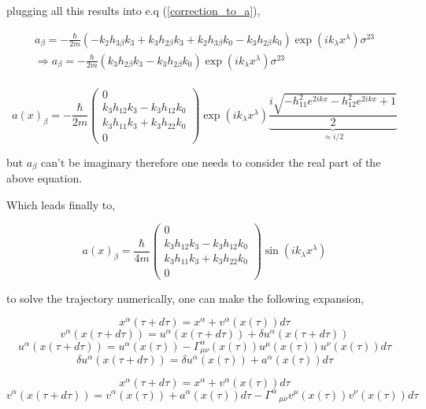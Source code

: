 \documentclass[12pt,a4paper]{article}
\begin{document}
	plugging all this results into e.q (\ref{correction_to_a}),
	
	
	\begin{multline}
		a_\beta = -\frac{\hbar}{2m}\left(- k_2  h_{3 \beta}  k_3 + k_3 h_{2 \beta}  k_3  + k_2  h_{3 \beta}  k_0 - k_3  h_{2 \beta}  k_0\right) \exp\left(i k_{\lambda} x^{\lambda}\right) \sigma^{23} \\
		\Rightarrow a_\beta = -\frac{\hbar}{2m}\left( k_3 h_{2 \beta}  k_3  - k_3  h_{2 \beta}  k_0\right) \exp\left(i k_{\lambda} x^{\lambda}\right) \sigma^{23} \\
	\end{multline}
	
	
	$$
	a(x)_\beta = -\frac{\hbar}{2m}\left(\begin{matrix}0\\k_3 h_{12}  k_3  - k_3  h_{12}  k_0\\k_3 h_{11}  k_3  + k_3  h_{22}  k_0\\0\end{matrix}\right)\exp \left(i k_{\lambda} x^{\lambda}\right) \underbrace{\frac{i \sqrt{- h_{11}^{2} e^{2 i k x} - h_{12}^{2} e^{2 i k x} + 1}}{2}}_{\approx i/2}
	$$
	
	but $a_\beta$ can't be imaginary therefore one needs to consider the real part of the above equation.
	
	Which leads finally to,
	
	
	\begin{equation}
			\boxed{a(x)_\beta = \frac{\hbar}{4m}\left(\begin{matrix}0\\k_3 h_{12}  k_3  - k_3  h_{12}  k_0\\k_3 h_{11}  k_3  + k_3  h_{22}  k_0\\0\end{matrix}\right)\sin\left(i k_{\lambda} x^{\lambda}\right)}
	\end{equation}
	
	to solve the trajectory numerically, one can make the following expansion,
	
	$$
	x^\alpha(\tau + d\tau) = x^\alpha + v^\alpha(x(\tau))d\tau
	$$
	$$
	v^\alpha(x(\tau + d\tau)) = u^\alpha(x(\tau + d\tau)) + \delta u^\alpha(x(\tau + d\tau))
	$$
	$$
	u^\alpha(x(\tau + d\tau)) = u^\alpha(x(\tau)) - \Gamma^\alpha_{\mu \nu}(x(\tau))u^\mu(x(\tau)) u^\nu(x(\tau)) d\tau 
	$$
	$$
	\delta u^\alpha(x(\tau + d\tau)) = \delta u^\alpha(x(\tau)) + a^\alpha(x(\tau))d\tau
	$$
	
	
	\color{red}
	$$
	x^\alpha(\tau + d\tau) = x^\alpha + v^\alpha(x(\tau))d\tau
	$$
	$$
	v^\alpha(x(\tau + d\tau)) = v^\alpha(x(\tau)) + a^\alpha(x(\tau))d\tau - \Gamma^\alpha\,_{\mu \nu}v^\mu(x(\tau))v^\nu(x(\tau))d\tau
	$$
	
\end{document}
